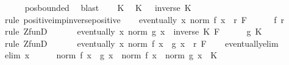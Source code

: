 \begin{isabellebody}
\ \ \ \ \isamarkupfalse%
\ pos{\isacharunderscore}{\kern0pt}bounded\ \isamarkupfalse%
\ blast\isanewline
\ \ \isamarkupfalse%
\ K\ \isamarkupfalse%
\ K{\isacharprime}{\kern0pt}{\isacharcolon}{\kern0pt}\ {\isachardoublequoteopen}{}\ {\isacharless}{\kern0pt}\ inverse\ K{\isachardoublequoteclose}\isanewline
\ \ \ \ \isamarkupfalse%
\ {\isacharparenleft}{\kern0pt}rule\ positive{\isacharunderscore}{\kern0pt}imp{\isacharunderscore}{\kern0pt}inverse{\isacharunderscore}{\kern0pt}positive{\isacharparenright}{\kern0pt}\isanewline
\ \ \isamarkupfalse%
\ {\isachardoublequoteopen}eventually\ {\isacharparenleft}{\kern0pt}{\isasymlambda}x{\isachardot}{\kern0pt}\ norm\ {\isacharparenleft}{\kern0pt}f\ x{\isacharparenright}{\kern0pt}\ {\isacharless}{\kern0pt}\ r{\isacharparenright}{\kern0pt}\ F{\isachardoublequoteclose}\isanewline
\ \ \ \ \isamarkupfalse%
\ f\ r\ \isamarkupfalse%
\ {\isacharparenleft}{\kern0pt}rule\ ZfunD{\isacharparenright}{\kern0pt}\isanewline
\ \ \isamarkupfalse%
\isanewline
\ \ \isamarkupfalse%
\ {\isachardoublequoteopen}eventually\ {\isacharparenleft}{\kern0pt}{\isasymlambda}x{\isachardot}{\kern0pt}\ norm\ {\isacharparenleft}{\kern0pt}g\ x{\isacharparenright}{\kern0pt}\ {\isacharless}{\kern0pt}\ inverse\ K{\isacharparenright}{\kern0pt}\ F{\isachardoublequoteclose}\isanewline
\ \ \ \ \isamarkupfalse%
\ g\ K{\isacharprime}{\kern0pt}\ \isamarkupfalse%
\ {\isacharparenleft}{\kern0pt}rule\ ZfunD{\isacharparenright}{\kern0pt}\isanewline
\ \ \isamarkupfalse%
\isanewline
\ \ \isamarkupfalse%
\ {\isachardoublequoteopen}eventually\ {\isacharparenleft}{\kern0pt}{\isasymlambda}x{\isachardot}{\kern0pt}\ norm\ {\isacharparenleft}{\kern0pt}f\ x\ {\isacharasterisk}{\kern0pt}{\isacharasterisk}{\kern0pt}\ g\ x{\isacharparenright}{\kern0pt}\ {\isacharless}{\kern0pt}\ r{\isacharparenright}{\kern0pt}\ F{\isachardoublequoteclose}\isanewline
\ \ \isamarkupfalse%
\ eventually{\isacharunderscore}{\kern0pt}elim\isanewline
\ \ \ \ \isamarkupfalse%
\ {\isacharparenleft}{\kern0pt}elim\ x{\isacharparenright}{\kern0pt}\isanewline
\ \ \ \ \isamarkupfalse%
\ {\isachardoublequoteopen}norm\ {\isacharparenleft}{\kern0pt}f\ x\ {\isacharasterisk}{\kern0pt}{\isacharasterisk}{\kern0pt}\ g\ x{\isacharparenright}{\kern0pt}\ {\isasymle}\ norm\ {\isacharparenleft}{\kern0pt}f\ x{\isacharparenright}{\kern0pt}\ {\isacharasterisk}{\kern0pt}\ norm\ {\isacharparenleft}{\kern0pt}g\ x{\isacharparenright}{\kern0pt}\ {\isacharasterisk}{\kern0pt}\ K{\isachardoublequoteclose}\isanewline

\end{isabellebody}
